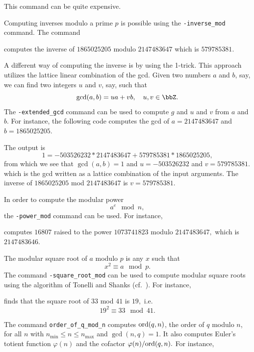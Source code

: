 
This command can be quite expensive.

\bigskip

Computing inverses modulo a prime $p$ is possible using the \verb'-inverse_mod' command. 
The command


computes the inverse of $1865025205$ modulo $2147483647$ which is $579785381.$

\bigskip


A different way of computing the inverse is by using the 1-trick. 
This approach utilizes the lattice linear combination of the gcd. 
Given two numbers $a$ and $b$, say, 
we can find two integers $u$ and $v$, say, such that  
$$
\gcd(a,b)  = ua+vb, \quad u,v \in \bbZ.
$$
The \verb'-extended_gcd' command can be used to compute $g$ and $u$ and $v$ from $a$ and $b.$ 
For instance, the following code 
computes the gcd of $a=2147483647$  and $b=1865025205$.


The output is
$$
1 = -503526232 * 2147483647 + 579785381 * 1865025205,
$$
from which we see that $\gcd(a,b) = 1$ 
and $u= -503526232$ and $v = 579785381.$
which is the gcd written as a lattice combination of the input arguments. 
The inverse of $1865025205$  mod $2147483647$ is $v=579785381.$

\bigskip

In order to compute the modular power
$$
a^e \mod n,
$$
the \verb'-power_mod' command can be used. For instance, 


computes 
$16807$ raised to the power $1073741823$ 
modulo $2147483647,$ which is $2147483646.$

\bigskip

The modular square root of $a$ modulo $p$ is any $x$ such that 
$$
x^2 \equiv a \mod p.
$$
The command \verb'-square_root_mod' can be used 
to compute modular square roots using 
the algorithm of Tonelli and Shanks (cf.~\cite{Cohen93}).
For instance, 


finds that the square root of $33$ mod $41$ is $19,$
i.e.
$$
19^2 \equiv 33 \mod 41.
$$

\bigskip


The command \verb'order_of_q_mod_n'
computes  ${\rm ord}(q,n)$, the order of $q$ modulo $n$, 
for all $n$ with $n_{\min} \le n \le n_{\max}$ and $\gcd(n,q) = 1$. 
It also computes Euler's totient function $\varphi(n)$ 
and the cofactor $\varphi(n)/{\rm ord}(q,n).$
For instance, 

